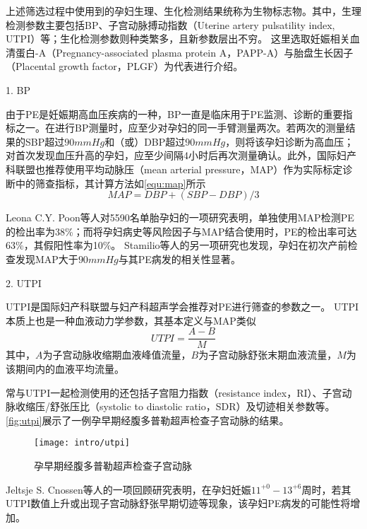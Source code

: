 上述筛选过程中使用到的孕妇生理、生化检测结果统称为生物标志物。其中，生理检测参数主要包括BP、子宫动脉搏动指数（Uterine artery pulsatility index, UTPI）等；生化检测参数则种类繁多，且新参数层出不穷\cite{Rene2008,Zhong2015,Zeisler2016,Rana2012}。
这里选取妊娠相关血清蛋白-A（Pregnancy-associated plasma protein A，PAPP-A）与胎盘生长因子（Placental growth factor，PLGF）为代表进行介绍。

1. BP

由于PE是妊娠期高血压疾病的一种，BP一直是临床用于PE监测、诊断的重要指标之一\cite{OAG9,HDASOM,2000s1}。在进行BP测量时，应至少对孕妇的同一手臂测量两次。若两次的测量结果的SBP超过$90mmHg$和（或）DBP超过$90mmHg$，则将该孕妇诊断为高血压；
对首次发现血压升高的孕妇，应至少间隔4小时后再次测量确认\cite{OAG9}。此外，国际妇产科联盟也推荐使用平均动脉压（mean arterial pressure，MAP）作为实际标定诊断中的筛查指标\cite{FIGO}，其计算方法如\autoref{equ:map}所示
\begin{equation}
    \label{equ:map}
    MAP=DBP+(SBP-DBP)/3
\end{equation}

Leona C.Y. Poon等人对5590名单胎孕妇的一项研究表明，单独使用MAP检测PE的检出率为38\%；而将孕妇病史等风险因子与MAP结合使用时，PE的检出率可达63\%，其假阳性率为10\%\cite{Poon2008}。
Stamilio等人的另一项研究也发现，孕妇在初次产前检查发现MAP大于$90mmHg$与其PE病发的相关性显著\cite{Stamilio2000}。

2. UTPI

UTPI是国际妇产科联盟与妇产科超声学会推荐对PE进行筛查的参数之一\cite{FIGO,Sotiriadis2019}。
UTPI本质上也是一种血液动力学参数，其基本定义与MAP类似\cite{Cnossen2008}
\begin{equation}
    \label{equ:utpi}
    UTPI=\frac{A-B}{M}
\end{equation}
其中，$A$为子宫动脉收缩期血液峰值流量，$B$为子宫动脉舒张末期血液流量，$M$为该期间内的血液平均流量。

常与UTPI一起检测使用的还包括子宫阻力指数（resistance index，RI）、子宫动脉收缩压/舒张压比（systolic to diastolic ratio，SDR）及切迹相关参数等\cite{Cnossen2008}。
\autoref{fig:utpi}展示了一例孕早期经腹多普勒超声检查子宫动脉的结果\cite{Sotiriadis2019}。
\begin{figure}[htbp]
    \centering
    \texttt{[image: intro/utpi]}
    \caption{\label{fig:utpi}孕早期经腹多普勒超声检查子宫动脉}
\end{figure}

Jeltsje S. Cnossen等人\cite{Cnossen2008}的一项回顾研究表明，在孕妇妊娠$11^{+0}-13^{+6}$周时，若其UTPI数值上升或出现子宫动脉舒张早期切迹等现象，该孕妇PE病发的可能性将增加\cite{OAG9,Plasencia2008}。

